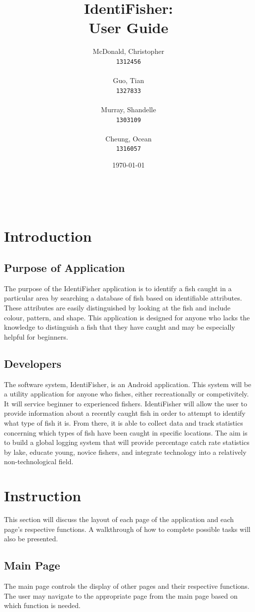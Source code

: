 \documentclass{article}
\title{IdentiFisher: \\ User Guide \\}
\author{
\Large McDonald, Christopher\\
\texttt{1312456} \\ \\
\Large Guo, Tian\\
\texttt{1327833} \\ \\
\Large Murray, Shandelle\\
\texttt{1303109} \\ \\
\Large Cheung, Ocean\\
\texttt{1316057} \\
}
\date{\today}
\begin{document}
\maketitle

\newpage
\tableofcontents
\vfill
\noindent \\


\pagebreak
\section{Introduction}

\subsection{Purpose of Application}
The purpose of the IdentiFisher application is to identify a fish caught in a particular area
by searching a database of fish based on identifiable attributes. These attributes are easily distinguished by looking at the fish and include
colour, pattern, and shape. This application is designed for anyone who lacks the knowledge to distinguish a fish that they have caught and may be especially helpful for beginners.

\subsection{Developers}
The software system, IdentiFisher, is an Android application.
This system will be a utility application for anyone who fishes, either recreationally or
competivitely. It will service beginner to experienced fishers. IdentiFisher will allow
the user to provide information about a recently caught fish in order to attempt to identify what type
of fish it is. From there, it is able to collect data and track statistics concerning which types of fish have been caught in specific locations. The aim is to
build a global logging system that will provide percentage catch rate statistics by lake,
educate young, novice fishers, and integrate technology into a relatively non-technological field.


\section{Instruction}
This section will discuss the layout of each page of the application and each page's respective functions.
A walkthrough of how to complete possible tasks will also be presented.

\subsection{Main Page}
The main page controls the display of other pages and their respective functions. The user may navigate to the
appropriate page from the main page based on which function is needed. \\
\end{document}
